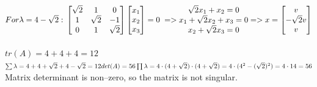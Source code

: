 \documentclass[eng,openany]{mgr}
\begin{document}
\begin{math}
For \lambda = 4-\sqrt{2}:\\
\begin{bmatrix}
\sqrt{2} & 1 & 0  \\
1 & \sqrt{2} & -1 \\
0 & 1 & \sqrt{2} 
\end{bmatrix}
\begin{bmatrix}
x_1 \\
x_2 \\
x_3
\end{bmatrix}
= 0\; =>
\begin{matrix}
\sqrt2x_1 +x_2 = 0\\
x_1+\sqrt2x_2+x_3 = 0\\
x_2+\sqrt2x_3=0
\end{matrix}
=>
x = 
\begin{bmatrix}
v\\
-\sqrt2v \\
v
\end{bmatrix}
\end{math}
\\ \\ 
$tr(A) = 4+4+4 = 12$\\
$\sum \lambda = 4 + 4 + \sqrt2 + 4 - \sqrt2 = 12
\\ \\
det(A) = 56\\
\prod \lambda = 4 \cdot (4+\sqrt2) \cdot (4+\sqrt2) = 4 \cdot (4^2-(\sqrt2)^2)= 4 \cdot 14 = 56$
\\
Matrix determinant is non--zero, so the matrix is not singular.
\end{document}
